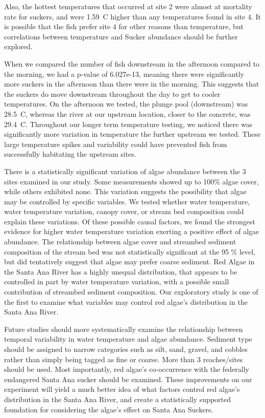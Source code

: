 \documentclass{article}\usepackage[]{graphicx}\usepackage[]{color}
\begin{document}
Also, the hottest temperatures that occurred at site 2 were almost at mortality rate for suckers, and were 1.59\textdegree~C higher than any temperatures found in site 4. It is possible that the fish prefer site 4 for other reasons than temperature, but correlations between temperature and Sucker abundance should be further explored.

When we compared the number of fish downstream in the afternoon compared to the morning, we had a p-value of 6.027e-13, meaning there were significantly more suckers in the afternoon than there were in the morning.  This suggests that the suckers do move downstream throughout the day to get to cooler temperatures.  On the afternoon we tested, the plunge pool (downstream) was 28.5\textdegree~C, whereas the river at our upstream location, closer to the concrete, was 29.4\textdegree~C. Throughout our longer term temperature testing, we noticed there was significantly more variation in temperature the further upstream we tested. These large temperature spikes and variability could have prevented fish from successfully habitating the upstream sites. 

There is a statistically significant variation of algae abundance between the 3 sites examined in our study. Some measurements showed up to 100\% algae cover, while others exhibited none. This variation suggests the possibility that algae may be controlled by specific variables. We tested whether water temperature, water temperature variation, canopy cover, or stream bed composition could explain these variations. Of these possible causal factors, we found the strongest evidence for higher water temperature variation exerting a positive effect of algae abundance. The relationship between algae cover and streambed sediment composition of the stream bed was not statistically significant at the 95 \% level, but did tentatively suggest that algae may prefer coarse sediment. Red Algae in the Santa Ana River has a highly unequal distribution, that appears to be controlled in part by water temperature variation, with a possible small contribution of streambed sediment composition. 
Our exploratory study is one of the first to examine what variables may control red algae's distribution in the Santa Ana River. 

Future studies should more systematically examine the relationship between temporal variability in water temperature and algae abundance. Sediment type should be assigned to narrow categories such as silt, sand, gravel, and cobbles rather than simply being tagged as fine or coarse. More than 3 reaches/sites should be used. Most importantly, red algae's co-occurrence with the federally endangered Santa Ana sucker should be examined. These improvements on our experiment will yield a much better idea of what factors control red algae's distribution in the Santa Ana River, and create a statistically supported foundation for considering the algae's effect on Santa Ana Suckers.
\end{document}

